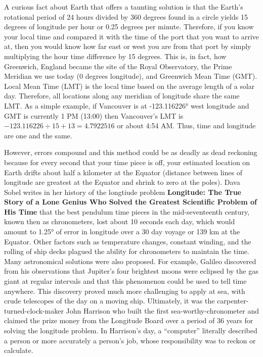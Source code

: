 \documentclass[
]{book}
\begin{document}
A curious fact about Earth that offers a taunting solution is that the Earth's rotational period of 24 hours divided by 360 degrees found in a circle yields 15 degrees of longitude per hour or 0.25 degrees per minute. Therefore, if you know your local time and compared it with the time of the port that you want to arrive at, then you would know how far east or west you are from that port by simply multiplying the hour time difference by 15 degrees. This is, in fact, how Greenwich, England became the site of the Royal Observatory, the Prime Meridian we use today (0 degrees longitude), and Greenwich Mean Time (GMT). Local Mean Time (LMT) is the local time based on the average length of a solar day. Therefore, all locations along any meridian of longitude share the same LMT. As a simple example, if Vancouver is at -123.116226° west longitude and GMT is currently 1 PM (13:00) then Vancouver's LMT is \(-123.116226÷15+13=4.7922516\) or about 4:54 AM. Thus, time and longitude are one and the same.

However, errors compound and this method could be as deadly as dead reckoning because for every second that your time piece is off, your estimated location on Earth drifts about half a kilometer at the Equator (distance between lines of longitude are greatest at the Equator and shrink to zero at the poles). Dava Sobel writes in her history of the longtiude problem \textbf{Longitude: The True Story of a Lone Genius Who Solved the Greatest Scientific Problem of His Time} that the best pendulum time pieces in the mid-seventeenth century, known then as chronometers, lost about 10 seconds each day, which would amount to 1.25° of error in longitude over a 30 day voyage or 139 km at the Equator. Other factors such as temperature changes, constant winding, and the rolling of ship decks plagued the ability for chronometers to maintain the time. Many astronomical solutions were also proposed. For example, Galileo discovered from his observations that Jupiter's four brightest moons were eclipsed by the gas giant at regular intervals and that this phenomenon could be used to tell time anywhere. This discovery proved much more challenging to apply at sea, with crude telescopes of the day on a moving ship. Ultimately, it was the carpenter-turned-clock-maker John Harrison who built the first sea-worthy-chronometer and claimed the prize money from the Longitude Board over a period of 36 years for solving the longitude problem. In Harrison's day, a ``computer'' literally described a person or more accurately a person's job, whose responsibility was to reckon or calculate.
\end{document}
